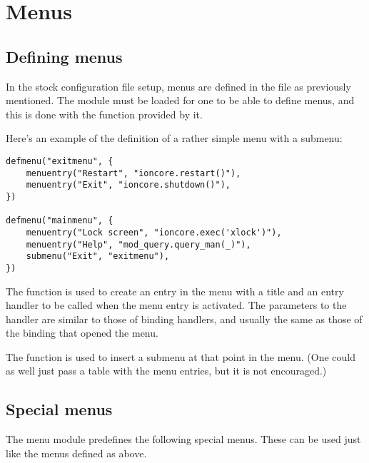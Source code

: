 \section{Menus}
\label{sec:menus}

\subsection{Defining menus}

In the stock configuration file setup, menus are defined in the file
 as previously mentioned. The  module
must be loaded for one to be able to define menus, and this is done with
the function  provided by it.

Here's an example of the definition of a rather simple menu with a submenu:

\begin{verbatim}
defmenu("exitmenu", {
    menuentry("Restart", "ioncore.restart()"),
    menuentry("Exit", "ioncore.shutdown()"),
})

defmenu("mainmenu", {
    menuentry("Lock screen", "ioncore.exec('xlock')"),
    menuentry("Help", "mod_query.query_man(_)"),
    submenu("Exit", "exitmenu"),
})
\end{verbatim}


The  function is used to create an entry in the 
menu with a title and an entry handler to be called when the menu entry
is activated. The parameters to the handler are similar to those of binding
handlers, and usually the same as those of the binding that opened the menu.

The  function is used to insert a submenu at that 
point in the menu. (One could as well just pass a table with the menu
entries, but it is not encouraged.)

\subsection{Special menus}

The menu module predefines the following special menus. These can be used
just like the menus defined as above.

